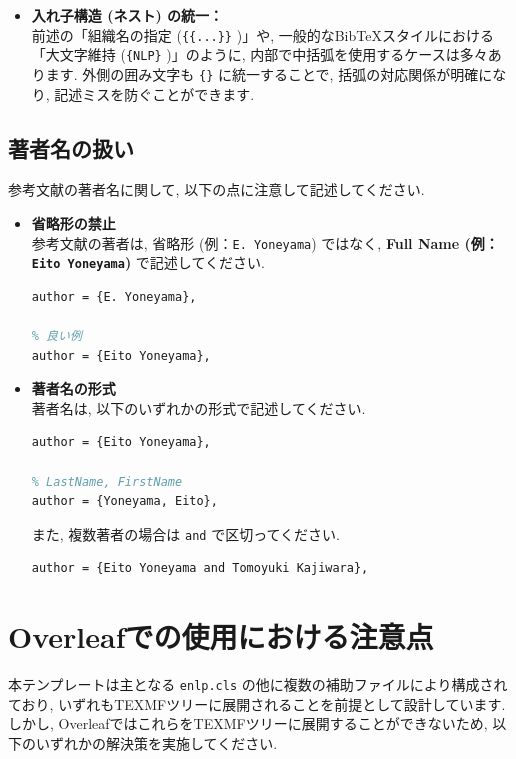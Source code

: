 \documentclass{ltjsarticle}
\newcommand{\pkg}[1]{\texttt{#1}}
\begin{document}
\begin{itemize}
\begin{itemize}
\begin{lstlisting}[language=TeX]
% 推奨される記述
title = {The impact of "AI" on society},
\end{lstlisting}

        \item \textbf{入れ子構造 (ネスト) の統一：} \\
        前述の「組織名の指定 (\texttt{\{\{...\}\}} )」や, 一般的なBibTeXスタイルにおける「大文字維持 (\texttt{\{NLP\}} )」のように, 内部で中括弧を使用するケースは多々あります. 外側の囲み文字も \texttt{\{\}} に統一することで, 括弧の対応関係が明確になり, 記述ミスを防ぐことができます.
    \end{itemize}
\end{itemize}

\subsection{著者名の扱い}
参考文献の著者名に関して, 以下の点に注意して記述してください.

\begin{itemize}
    \item \textbf{省略形の禁止} \\
    参考文献の著者は, 省略形 (例：\texttt{E. Yoneyama}) ではなく, \textbf{Full Name (例：\texttt{Eito Yoneyama})} で記述してください. 

\begin{lstlisting}[language=TeX]
% 悪い例
author = {E. Yoneyama},

% 良い例
author = {Eito Yoneyama},
\end{lstlisting}
    \item \textbf{著者名の形式} \\
    著者名は, 以下のいずれかの形式で記述してください.

\begin{lstlisting}[language=TeX]
% FirstName LastName
author = {Eito Yoneyama},

% LastName, FirstName
author = {Yoneyama, Eito},
\end{lstlisting}

また, 複数著者の場合は \texttt{and} で区切ってください.
\begin{lstlisting}[language=TeX]
author = {Eito Yoneyama and Tomoyuki Kajiwara},
\end{lstlisting}
\end{itemize}
\section{Overleafでの使用における注意点}
本テンプレートは主となる \pkg{enlp.cls} の他に複数の補助ファイルにより構成されており, いずれもTEXMFツリーに展開されることを前提として設計しています. 
しかし, OverleafではこれらをTEXMFツリーに展開することができないため, 以下のいずれかの解決策を実施してください. 
\end{document}
